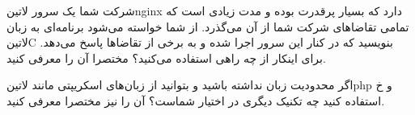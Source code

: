 
شرکت شما یک سرور ‌لاتین{nginx} دارد که بسیار پرقدرت بوده و مدت زیادی است که تمامی تقاضاهای شرکت شما از آن می‌گذرد. از شما خواسته می‌شود برنامه‌ای به زبان ‌لاتین{C} بنویسید که در کنار این سرور اجرا شده و به برخی از تقاضاها پاسخ می‌دهد. برای اینکار از چه راهی استفاده می‌کنید؟ مختصرا آن را معرفی کنید.

اگر محدودیت زبان نداشته باشید و بتوانید از زبان‌های اسکریپتی مانند ‌لاتین{php} و ‌خ استفاده کنید چه تکنیک دیگری در اختیار شماست؟ آن را نیز مختصرا معرفی کنید.

